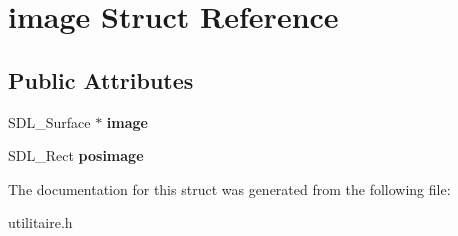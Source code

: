 \hypertarget{structimage}{}\section{image Struct Reference}
\label{structimage}
\subsection*{Public Attributes}
\begin{DoxyCompactItemize}
\item 
S\+D\+L\+\_\+\+Surface $\ast$ {\bfseries image}\hypertarget{structimage_a68c71e2eca756ac70ef1b8a2339a5e3f}{}\label{structimage_a68c71e2eca756ac70ef1b8a2339a5e3f}

\item 
S\+D\+L\+\_\+\+Rect {\bfseries posimage}\hypertarget{structimage_a3a1da83b39faccddb0cd937844ba9e0b}{}\label{structimage_a3a1da83b39faccddb0cd937844ba9e0b}

\end{DoxyCompactItemize}


The documentation for this struct was generated from the following file\+:\begin{DoxyCompactItemize}
\item 
utilitaire.\+h\end{DoxyCompactItemize}
